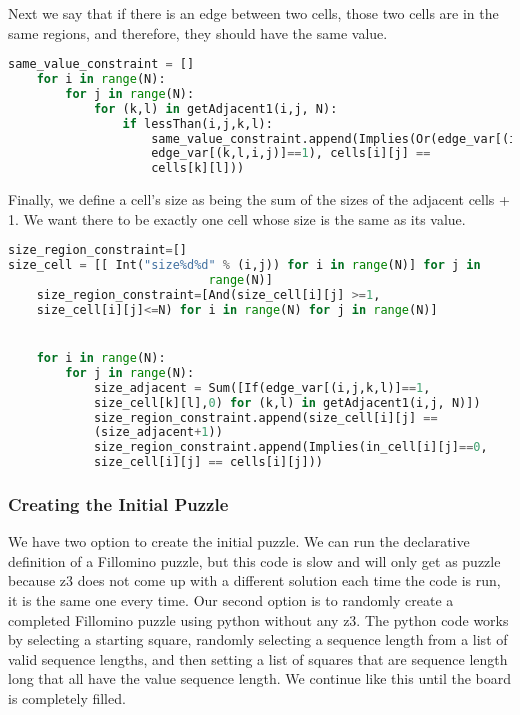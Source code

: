 Next we say that if there is an edge between two cells, those two
cells are in the same regions, and therefore, they should have the
same value.

\begin{lstlisting}[language=python]
  same_value_constraint = []
    for i in range(N):
        for j in range(N):
            for (k,l) in getAdjacent1(i,j, N):
                if lessThan(i,j,k,l):
                    same_value_constraint.append(Implies(Or(edge_var[(i,j,k,l)]==1,
                    edge_var[(k,l,i,j)]==1), cells[i][j] ==
                    cells[k][l]))

\end{lstlisting}

Finally, we define a cell’s size as being the sum of the sizes of the
adjacent cells + 1. We want there to be exactly one cell whose size is
the same as its value.


\begin{lstlisting}[language=python]
size_region_constraint=[]
size_cell = [[ Int("size%d%d" % (i,j)) for i in range(N)] for j in
                            range(N)]
    size_region_constraint=[And(size_cell[i][j] >=1,
    size_cell[i][j]<=N) for i in range(N) for j in range(N)]


    for i in range(N):
        for j in range(N):
            size_adjacent = Sum([If(edge_var[(i,j,k,l)]==1,
            size_cell[k][l],0) for (k,l) in getAdjacent1(i,j, N)])
            size_region_constraint.append(size_cell[i][j] ==
            (size_adjacent+1))
            size_region_constraint.append(Implies(in_cell[i][j]==0,
            size_cell[i][j] == cells[i][j]))
\end{lstlisting}


\subsubsection{Creating the Initial Puzzle}
We have two option to create the initial puzzle. We can run the
declarative definition of a Fillomino puzzle, but this code is slow
and will only get as puzzle because z3 does not come up with a
different solution each time the code is run, it is the same one every
time. Our second option is to randomly create a completed Fillomino
puzzle using python without any z3. The python code works by selecting
a starting square, randomly selecting a sequence length from a list of
valid sequence lengths, and then setting a list of squares that are
sequence length long that all have the value sequence length. We
continue like this until the board is completely filled.



